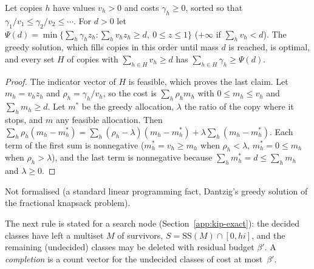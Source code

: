 \begin{lemma}\label{lem:fractional}
Let copies $h$ have values $v_h>0$ and costs $\gamma_h\ge 0$, sorted so that
$\gamma_1/v_1\le\gamma_2/v_2\le\cdots$. For $d>0$ let
$\Psi(d)=\min\{\sum_h\gamma_h z_h:\sum_h v_hz_h\ge d,\ 0\le z\le 1\}$ ($+\infty$
if $\sum_h v_h<d$). The greedy solution, which fills copies in this order
until mass $d$ is reached, is optimal, and every set $H$ of copies with
$\sum_{h\in H}v_h\ge d$ has $\sum_{h\in H}\gamma_h\ge\Psi(d)$.
\end{lemma}
\begin{proof}
The indicator vector of $H$ is feasible, which proves the last claim. Let
$m_h=v_hz_h$ and $\rho_h=\gamma_h/v_h$, so the cost is $\sum_h\rho_hm_h$ with
$0\le m_h\le v_h$ and $\sum_h m_h\ge d$. Let $m^{*}$ be the greedy allocation,
$\lambda$ the ratio of the copy where it stops, and $m$ any feasible
allocation. Then
$\sum_h\rho_h(m_h-m^{*}_h)=\sum_h(\rho_h-\lambda)(m_h-m^{*}_h)+\lambda\sum_h(m_h-m^{*}_h)$.
Each term of the first sum is nonnegative ($m^{*}_h=v_h\ge m_h$ when
$\rho_h<\lambda$, $m^{*}_h=0\le m_h$ when $\rho_h>\lambda$), and the last term is
nonnegative because $\sum_hm^{*}_h=d\le\sum_hm_h$ and $\lambda\ge 0$.
\end{proof}
\noindent Not formalised (a standard linear programming fact, Dantzig's greedy
solution of the fractional knapsack problem\cite{dantzig1957discrete}).

The next rule is stated for a search node (Section~\ref{app:kip-exact}): the
decided classes have left a multiset $M$ of survivors, $S=\mathrm{SS}(M)\cap[0,hi]$,
and the remaining (undecided) classes may be deleted with residual budget
$\beta'$. A \emph{completion} is a count vector for the undecided classes of
cost at most~$\beta'$.

